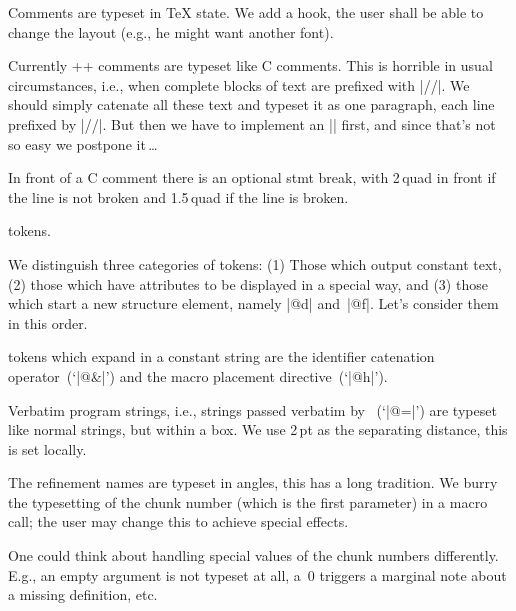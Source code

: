 \documentclass{progltx}
\begin{document}
\sect Comments are typeset in \TeX{} state. We add a hook, the user
shall be able to change the layout (e.g., he might want another font).
%
\begin{fixme}
  Currently \C++ comments are typeset like C comments. This is
  horrible in usual circumstances, i.e., when complete blocks of text
  are prefixed with |//|. We should simply catenate all these text and
  typeset it as one paragraph, each line prefixed by |//|. But then we
  have to implement an |\everyline| first, and since that's not so
  easy we postpone it\,\dots
\end{fixme}
%
In front of a C comment there is an optional stmt break, with 2\,quad
in front if the line is not broken and 1.5\,quad if the line is broken.

\beginprog
\def\CwebComment#1{%
    \5%
    \hskip 1.5em
    $/\ast\,$%
    {\cwbb@tex
	\CwebCommentHook
	#1%
    }%
    $\,\ast/$%
    }
\let\CwebCommentHook\relax
\let\CwebCxxComment\CwebComment
\endprog





\chap \cweb{} tokens.

We distinguish three categories of \cweb{} tokens: (1) Those which
output constant text, (2) those which have attributes to be displayed
in a special way, and (3) those which start a new structure element,
namely |@d| and~|@f|. Let's consider them in this order.


\sect \cweb{} tokens which expand in a constant string are the
identifier catenation operator~(`|@&|') and the macro placement
directive~(`|@h|').

\beginprog
\def\CwebIdCat{\CwebString{@\&}}
\def\CwebMacrosHere{%
    \begingroup
	\def\CwebRefNumber##1{}%
	\CwebRefName :Preprocessor definitions\X
    \endgroup
    }
\endprog


\sect Verbatim program strings, i.e., strings passed verbatim by
\ctangle{}~(`|@=|') are typeset like normal strings, but within a box.
We use 2\,pt as the separating distance, this is set locally.

\beginprog
\def\CwebVerbString#1{{\fboxsep\tw@\p@ \fbox{\CwebString{#1}}}}
\endprog


\sect The refinement names are typeset in angles, this has a long
tradition. We burry the typesetting of the chunk number (which is
the first parameter) in a macro call; the user may change this to
achieve special effects.
%
\begin{fixme}
  One could think about handling special values of the chunk numbers
  differently. E.g., an empty argument is not typeset at all, a~0
  triggers a marginal note about a missing definition, etc.
\end{fixme}
\end{document}
